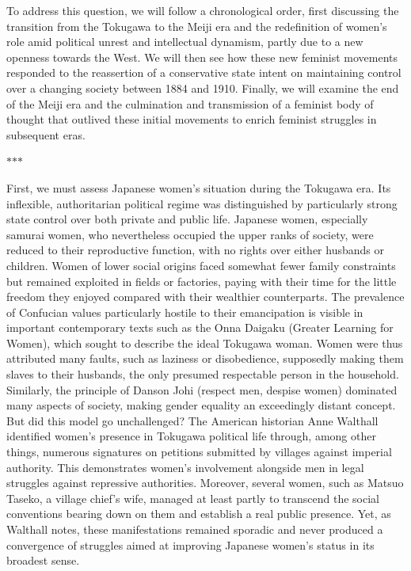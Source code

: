 \documentclass[11pt,a4paper]{article}
\newcommand{\partbreak}{\par\begin{center}\color{muted}$\ast$\quad$\ast$\quad$\ast$\end{center}\par}
\begin{document}
To address this question, we will follow a chronological order, first discussing the transition from the Tokugawa to the Meiji era and the redefinition of women's role amid political unrest and intellectual dynamism, partly due to a new openness towards the West. We will then see how these new feminist movements responded to the reassertion of a conservative state intent on maintaining control over a changing society between 1884 and 1910. Finally, we will examine the end of the Meiji era and the culmination and transmission of a feminist body of thought that outlived these initial movements to enrich feminist struggles in subsequent eras.

\partbreak

First, we must assess Japanese women's situation during the Tokugawa era. Its inflexible, authoritarian political regime was distinguished by particularly strong state control over both private and public life. Japanese women, especially samurai women, who nevertheless occupied the upper ranks of society, were reduced to their reproductive function, with no rights over either husbands or children. Women of lower social origins faced somewhat fewer family constraints but remained exploited in fields or factories, paying with their time for the little freedom they enjoyed compared with their wealthier counterparts. The prevalence of Confucian values particularly hostile to their emancipation is visible in important contemporary texts such as the Onna Daigaku (Greater Learning for Women), which sought to describe the ideal Tokugawa woman. Women were thus attributed many faults, such as laziness or disobedience, supposedly making them slaves to their husbands, the only presumed respectable person in the household. Similarly, the principle of Danson Johi (respect men, despise women) dominated many aspects of society, making gender equality an exceedingly distant concept. But did this model go unchallenged? The American historian Anne Walthall identified women's presence in Tokugawa political life through, among other things, numerous signatures on petitions submitted by villages against imperial authority. This demonstrates women's involvement alongside men in legal struggles against repressive authorities. Moreover, several women, such as Matsuo Taseko, a village chief's wife, managed at least partly to transcend the social conventions bearing down on them and establish a real public presence. Yet, as Walthall notes, these manifestations remained sporadic and never produced a convergence of struggles aimed at improving Japanese women's status in its broadest sense.
\end{document}
